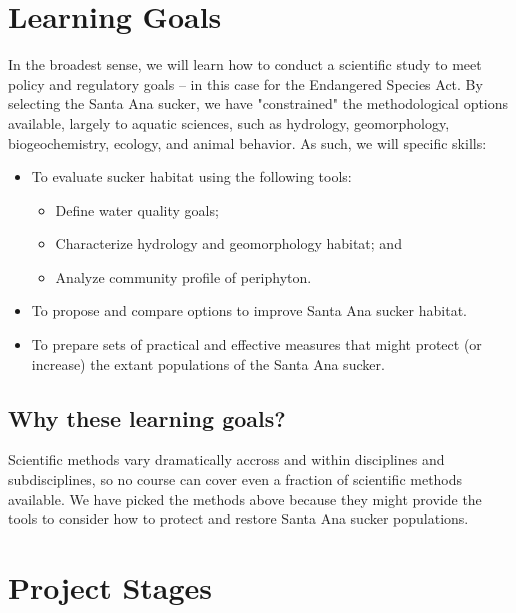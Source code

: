 \documentclass{tufte-handout}\usepackage[]{graphicx}\usepackage[]{color}
\begin{document}
\section{Learning Goals}

In the broadest sense, we will learn how to conduct a scientific study to meet policy and regulatory goals -- in this case for the Endangered Species Act. By selecting the Santa Ana sucker, we have "constrained" the methodological options available, largely to aquatic sciences, such as hydrology, geomorphology, biogeochemistry, ecology, and animal behavior. As such, we will specific skills: 

\begin{itemize}
  \item To evaluate sucker habitat using the following tools:
  \begin{itemize}
    \item Define water quality goals;
    \item Characterize hydrology and geomorphology habitat; and
    \item Analyze community profile of periphyton.
  \end{itemize}
  \item To propose and compare options to improve Santa Ana sucker habitat.
  \item To prepare sets of practical and effective measures that might protect (or increase) the extant populations of the Santa Ana sucker.
\end{itemize}

\subsection{Why these learning goals?}

Scientific methods vary dramatically accross and within disciplines and subdisciplines, so no course can cover even a fraction of scientific methods available. We have picked the methods above because they might provide the tools to consider how to protect and restore Santa Ana sucker populations.

\section{Project Stages}
\end{document}
